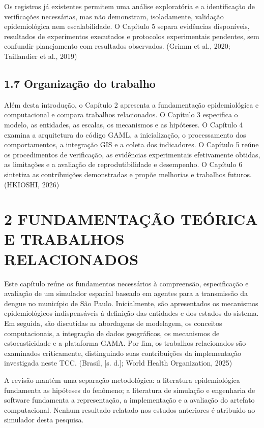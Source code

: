 Os registros já existentes permitem uma análise exploratória e a
identificação de verificações necessárias, mas não demonstram,
isoladamente, validação epidemiológica nem escalabilidade. O Capítulo 5
separa evidências disponíveis, resultados de experimentos executados e
protocolos experimentais pendentes, sem confundir planejamento com
resultados observados. (Grimm et al., 2020; Taillandier et al., 2019)

\subsection{1.7 Organização do
trabalho}\label{organizauxe7uxe3o-do-trabalho}

Além desta introdução, o Capítulo 2 apresenta a fundamentação
epidemiológica e computacional e compara trabalhos relacionados. O
Capítulo 3 especifica o modelo, as entidades, as escalas, os mecanismos
e as hipóteses. O Capítulo 4 examina a arquitetura do código GAML, a
inicialização, o processamento dos comportamentos, a integração GIS e a
coleta dos indicadores. O Capítulo 5 reúne os procedimentos de
verificação, as evidências experimentais efetivamente obtidas, as
limitações e a avaliação de reprodutibilidade e desempenho. O Capítulo 6
sintetiza as contribuições demonstradas e propõe melhorias e trabalhos
futuros. (HKIOSHI, 2026)

\section{2 FUNDAMENTAÇÃO TEÓRICA E TRABALHOS
RELACIONADOS}\label{fundamentauxe7uxe3o-teuxf3rica-e-trabalhos-relacionados}

Este capítulo reúne os fundamentos necessários à compreensão,
especificação e avaliação de um simulador espacial baseado em agentes
para a transmissão da dengue no município de São Paulo. Inicialmente,
são apresentados os mecanismos epidemiológicos indispensáveis à
definição das entidades e dos estados do sistema. Em seguida, são
discutidas as abordagens de modelagem, os conceitos computacionais, a
integração de dados geográficos, os mecanismos de estocasticidade e a
plataforma GAMA. Por fim, os trabalhos relacionados são examinados
criticamente, distinguindo suas contribuições da implementação
investigada neste TCC. (Brasil, {[}s. d.{]}; World Health Organization,
2025)

A revisão mantém uma separação metodológica: a literatura epidemiológica
fundamenta as hipóteses do fenômeno; a literatura de simulação e
engenharia de software fundamenta a representação, a implementação e a
avaliação do artefato computacional. Nenhum resultado relatado nos
estudos anteriores é atribuído ao simulador desta pesquisa.

